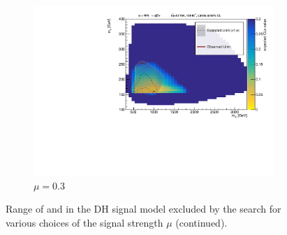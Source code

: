 \begin{figure}
\begin{subfigure}{0.48\textwidth}
    \includegraphics[width=\textwidth]{Figures/App_signal_strength/unblinded_mu0_3_nosig.pdf}
    \caption{\(\mu=0.3	\)}\label{fig:unblinded_0.3}
  \end{subfigure} \hspace{0.3em}
  \caption[]{Range of \ms and \mZp in the DH signal model excluded by the search for various choices of the signal strength \(\mu\) (continued).}
\end{figure}

\captionsetup[figure]{list=yes}